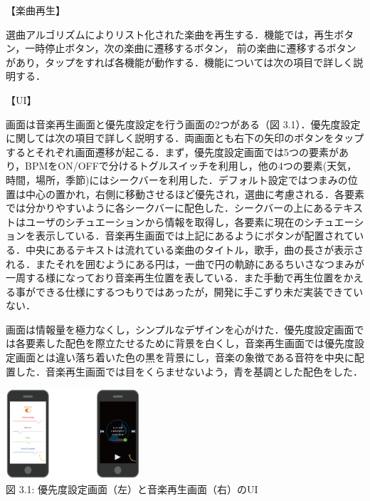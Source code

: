 【楽曲再生】
\par
選曲アルゴリズムによりリスト化された楽曲を再生する．機能では，再生ボタン，一時停止ボタン，次の楽曲に遷移するボタン，
前の楽曲に遷移するボタンがあり，タップをすれば各機能が動作する．機能については次の項目で詳しく説明する．
\par
【UI】
\par
画面は音楽再生画面と優先度設定を行う画面の2つがある（図 3.1）．優先度設定に関しては次の項目で詳しく説明する．両画面とも右下の矢印のボタンをタップするとそれぞれ画面遷移が起こる．まず，優先度設定画面では5つの要素があり，BPMをON/OFFで分けるトグルスイッチを利用し，他の4つの要素(天気，時間，場所，季節)にはシークバーを利用した．デフォルト設定ではつまみの位置は中心の置かれ，右側に移動させるほど優先され，選曲に考慮される．各要素では分かりやすいように各シークバーに配色した．シークバーの上にあるテキストはユーザのシチュエーションから情報を取得し，各要素に現在のシチュエーションを表示している．音楽再生画面では上記にあるようにボタンが配置されている．中央にあるテキストは流れている楽曲のタイトル，歌手，曲の長さが表示される．またそれを囲むようにある円は，一曲で円の軌跡にあるちいさなつまみが一周する様になっており音楽再生位置を表している．また手動で再生位置をかえる事ができる仕様にするつもりではあったが，開発に手こずり未だ実装できていない．
\par
画面は情報量を極力なくし，シンプルなデザインを心がけた．優先度設定画面では各要素した配色を際立たせるために背景を白くし，音楽再生画面では優先度設定画面とは違い落ち着いた色の黒を背景にし，音楽の象徴である音符を中央に配置した．音楽再生画面では目をくらませないよう，青を基調とした配色をした．

\begin{center}
\includegraphics[width=5cm, bb=0 0 200 150]{UI.png}\\図 3.1: 優先度設定画面（左）と音楽再生画面（右）のUI
\end{center}

